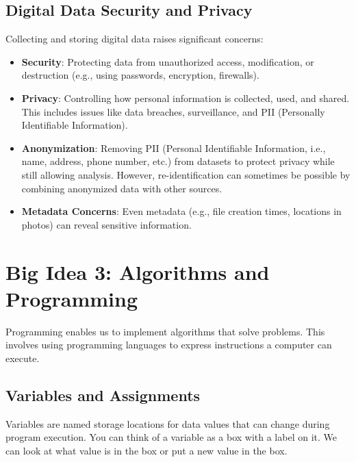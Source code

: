 \documentclass[11pt,oneside]{book}
\begin{document}
\section{Digital Data Security and Privacy}
\label{sec:data_security_privacy}
Collecting and storing digital data raises significant concerns:
\begin{itemize}
    \item \textbf{Security}: Protecting data from unauthorized access, modification, or destruction (e.g., using passwords, encryption, firewalls).
    \item \textbf{Privacy}: Controlling how personal information is collected, used, and shared. This includes issues like data breaches, surveillance, and PII (Personally Identifiable Information).
    \item \textbf{Anonymization}: Removing PII (Personal Identifiable Information, i.e., name, address, phone number, etc.) from datasets to protect privacy while still allowing analysis. However, re-identification can sometimes be possible by combining anonymized data with other sources.
    \item \textbf{Metadata Concerns}: Even metadata (e.g., file creation times, locations in photos) can reveal sensitive information.
\end{itemize}

\chapter{Big Idea 3: Algorithms and Programming}
\label{chap:algorithms_programming}
Programming enables us to implement algorithms that solve problems. This involves using programming languages to express instructions a computer can execute.

\section{Variables and Assignments}
\label{sec:variables_assignment}
Variables are named storage locations for data values that can change during program execution. You can think of a variable as a box with a label on it. We can look at what value is in the box or put a new value in the box.
\end{document}
